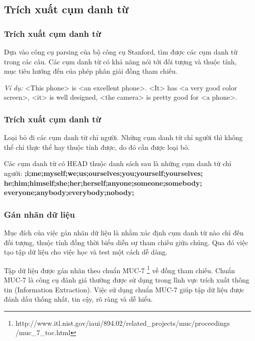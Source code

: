 \documentclass{beamer}
\begin{document}
\subsection{Trích xuất cụm danh từ}
\begin{frame}
\frametitle{Trích xuất cụm danh từ}
\begin{block}{}
Dựa vào công cụ parsing của bộ công cụ Stanford, tìm được các cụm danh từ trong các câu. Các cụm danh từ có khả năng nói tới đối tượng và thuộc tính, mục tiêu hướng đến của phép phân giải đồng tham chiếu.
\end{block}
\begin{block}{}
\textit{Ví dụ:}
<This phone> is <an excellent phone>.  <It> has <a very good color screen>, <it> is well designed, <the camera> is pretty good for <a phone>.
\end{block}
\end{frame}

\begin{frame}
\frametitle{Trích xuất cụm danh từ}
\begin{block}{}
Loại bỏ đi các cụm danh từ chỉ người. Những cụm danh từ chỉ người thì không thể chỉ thực thể hay thuộc tính được, do đó cần được loại bỏ.
\end{block}
\begin{block}{}
Các cụm danh từ có HEAD thuộc danh sách sau là những cụm danh từ chỉ người:
\textbf{;i;me;myself;we;us;ourselves;you;yourself;yourselves;\\he;him;himself;she;her;herself;anyone;someone;somebody;\\everyone;anybody;everybody;nobody;}
\end{block}
\end{frame}

\begin{frame}
\frametitle{Gán nhãn dữ liệu}
\begin{block}{}
Mục đích của việc gán nhãn dữ liệu là nhằm xác định cụm danh từ nào chỉ đến đối tượng, thuộc tính đồng thời biểu diễn sự tham chiếu giữa chúng. Qua đó việc tạo tập dữ liệu cho việc học và test một cách dễ dàng.
\end{block}
\begin{block}{}
Tập dữ liệu được gán nhãn theo chuẩn MUC-7 \footnote{http://www.itl.nist.gov/iaui/894.02/related\_projects/muc/proceedings
/muc\_7\_toc.html} về đồng tham chiếu. Chuẩn MUC-7 là công cụ đánh giá thường được sử dụng trong lĩnh vực trích xuất thông tin (Information Extraction). Việc sử dụng chuẩn MUC-7 giúp tập dữ liệu được đánh dấu thống nhất, tin cậy, rõ ràng và dễ hiểu.
\end{block}
\end{frame}
\end{document}
